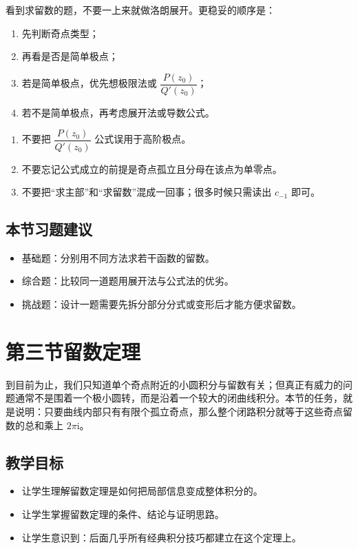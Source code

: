 \begin{tishi}[本节最想让学生形成的习惯]
看到求留数的题，不要一上来就做洛朗展开。更稳妥的顺序是：
\begin{enumerate}
    \item 先判断奇点类型；
    \item 再看是否是简单极点；
    \item 若是简单极点，优先想极限法或 $\dfrac{P(z_0)}{Q'(z_0)}$；
    \item 若不是简单极点，再考虑展开法或导数公式。
\end{enumerate}
\end{tishi}

\begin{jinshi}[本节易错点]
\begin{enumerate}
    \item 不要把 $\dfrac{P(z_0)}{Q'(z_0)}$ 公式误用于高阶极点。
    \item 不要忘记公式成立的前提是奇点孤立且分母在该点为单零点。
    \item 不要把``求主部''和``求留数''混成一回事；很多时候只需读出 $c_{-1}$ 即可。
\end{enumerate}
\end{jinshi}

\subsection*{本节习题建议}
\begin{itemize}
    \item 基础题：分别用不同方法求若干函数的留数。
    \item 综合题：比较同一道题用展开法与公式法的优劣。
    \item 挑战题：设计一题需要先拆分部分分式或变形后才能方便求留数。
\end{itemize}

\section{第三节\quad 留数定理}

\begin{wulibj}[本节要解决的问题]
到目前为止，我们只知道单个奇点附近的小圆积分与留数有关；但真正有威力的问题通常不是围着一个极小圆转，而是沿着一个较大的闭曲线积分。本节的任务，就是说明：只要曲线内部只有有限个孤立奇点，那么整个闭路积分就等于这些奇点留数的总和乘上 $2\pi \mathrm{i}$。
\end{wulibj}

\subsection*{教学目标}
\begin{itemize}
    \item 让学生理解留数定理是如何把局部信息变成整体积分的。
    \item 让学生掌握留数定理的条件、结论与证明思路。
    \item 让学生意识到：后面几乎所有经典积分技巧都建立在这个定理上。
\end{itemize}

